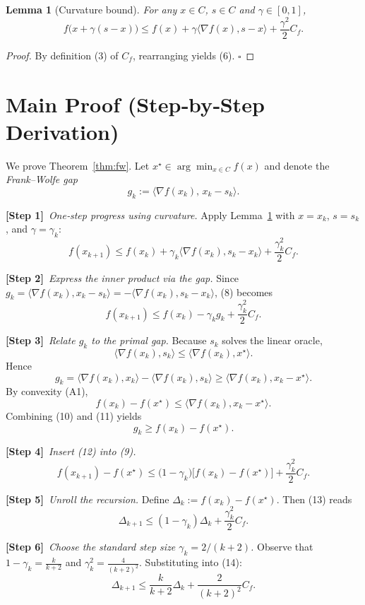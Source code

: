 \documentclass{article}
\newtheorem{lemma}{Lemma}
\begin{document}
\begin{lemma}[Curvature bound]\label{lem:curv}
For any $x\in C$, $s\in C$ and $\gamma\in[0,1]$,
\[
f\bigl(x+\gamma(s-x)\bigr) \le f(x)+\gamma\langle\nabla f(x),s-x\rangle+\frac{\gamma^{2}}{2}C_f . \tag{6}
\]
\end{lemma}
\begin{proof}
By definition (3) of $C_f$, rearranging yields (6). $\square$
\end{proof}

\section*{Main Proof (Step‑by‑Step Derivation)}
We prove Theorem~\ref{thm:fw}. Let $x^\star\in\arg\min_{x\in C}f(x)$ and denote the \emph{Frank–Wolfe gap}
\[
g_k := \langle \nabla f(x_k),\,x_k-s_k\rangle .
\tag{7}
\]

\noindent\textbf{[Step 1]}~\emph{One‑step progress using curvature.}  
Apply Lemma~\ref{lem:curv} with $x=x_k$, $s=s_k$, and $\gamma=\gamma_k$:
\[
f(x_{k+1}) 
\le f(x_k)+\gamma_k\langle\nabla f(x_k),s_k-x_k\rangle+\frac{\gamma_k^{2}}{2}C_f .
\tag{8}
\]

\noindent\textbf{[Step 2]}~\emph{Express the inner product via the gap.}  
Since $g_k = \langle\nabla f(x_k),x_k-s_k\rangle = -\langle\nabla f(x_k),s_k-x_k\rangle$, (8) becomes
\[
f(x_{k+1}) \le f(x_k)-\gamma_k g_k+\frac{\gamma_k^{2}}{2}C_f .
\tag{9}
\]

\noindent\textbf{[Step 3]}~\emph{Relate $g_k$ to the primal gap.}  
Because $s_k$ solves the linear oracle,
\[
\langle\nabla f(x_k),s_k\rangle \le \langle\nabla f(x_k),x^\star\rangle .
\]
Hence
\[
g_k = \langle\nabla f(x_k),x_k\rangle-\langle\nabla f(x_k),s_k\rangle
\ge \langle\nabla f(x_k),x_k-x^\star\rangle .
\tag{10}
\]
By convexity (A1),
\[
f(x_k)-f(x^\star) \le \langle\nabla f(x_k),x_k-x^\star\rangle .
\tag{11}
\]
Combining (10) and (11) yields
\[
g_k \ge f(x_k)-f(x^\star). \tag{12}
\]

\noindent\textbf{[Step 4]}~\emph{Insert (12) into (9).}
\[
f(x_{k+1})-f(x^\star) \le \bigl(1-\gamma_k\bigr)\bigl[f(x_k)-f(x^\star)\bigr]+\frac{\gamma_k^{2}}{2}C_f .
\tag{13}
\]

\noindent\textbf{[Step 5]}~\emph{Unroll the recursion.}  
Define $\Delta_k:=f(x_k)-f(x^\star)$. Then (13) reads
\[
\Delta_{k+1} \le (1-\gamma_k)\Delta_k+\frac{\gamma_k^{2}}{2}C_f .
\tag{14}
\]

\noindent\textbf{[Step 6]}~\emph{Choose the standard step size $\gamma_k=2/(k+2)$.}  
Observe that $1-\gamma_k = \frac{k}{k+2}$ and $\gamma_k^{2}= \frac{4}{(k+2)^{2}}$. Substituting into (14):
\[
\Delta_{k+1} \le \frac{k}{k+2}\Delta_k+\frac{2}{(k+2)^{2}}C_f .
\tag{15}
\]
\end{document}
